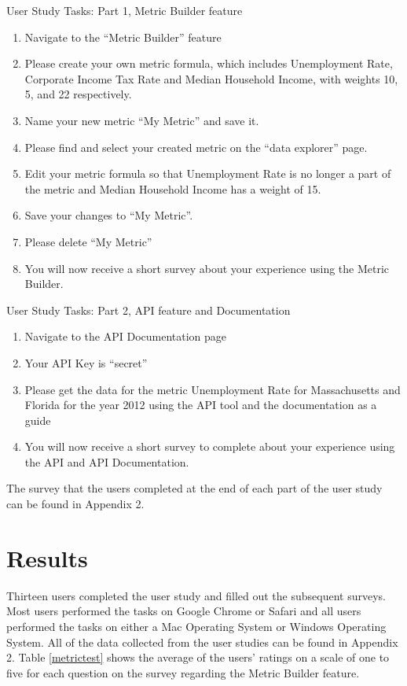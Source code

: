 	User Study Tasks: Part 1, Metric Builder feature
	\begin{enumerate}
		\item
			Navigate to the “Metric Builder” feature
		\item
			Please create your own metric formula, which includes Unemployment Rate, Corporate Income Tax Rate and Median Household Income, with weights 10, 5, and 22 respectively.
		\item
			Name your new metric “My Metric” and save it.
		\item
			Please find and select your created metric on the “data explorer” page.
		\item
			Edit your metric formula so that Unemployment Rate is no longer a part of the metric and Median Household Income has a weight of 15.
		\item
			Save your changes to “My Metric”.
		\item
			Please delete “My Metric”
		\item
			You will now receive a short survey about your experience using the Metric Builder.	
	\end{enumerate}
	
	User Study Tasks: Part 2, API feature and Documentation
	\begin{enumerate}
		\item
			Navigate to the API Documentation page	
		\item
			Your API Key is “secret”
		\item
			Please get the data for the metric Unemployment Rate for Massachusetts and Florida for the year 2012 using the API tool and the documentation as a guide
		\item
			You will now receive a short survey to complete about your experience using the API and API Documentation.
	\end{enumerate}
	The survey that the users completed at the end of each part of the user study can be found in Appendix 2.
	
\section{Results}

	Thirteen users completed the user study and filled out the subsequent surveys. Most users performed the tasks on Google Chrome or Safari and all users performed the tasks on either a Mac Operating System or Windows Operating System. All of the data collected from the user studies can be found in Appendix 2. Table \ref{metrictest} shows the average of the users’ ratings on a scale of one to five for each question on the survey regarding the Metric Builder feature.
	
